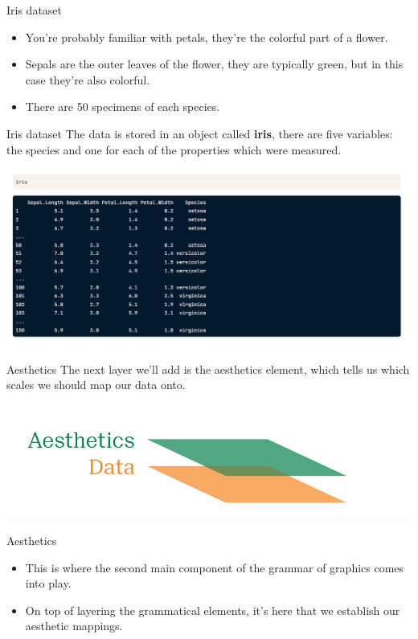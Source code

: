 \documentclass[
  ignorenonframetext,
]{beamer}
\begin{document}
\begin{frame}{Iris dataset}
\label{iris-dataset-2}
\begin{itemize}
\item
  You're probably familiar with petals, they're the colorful part of a
  flower.
\item
  Sepals are the outer leaves of the flower, they are typically green,
  but in this case they're also colorful.
\item
  There are 50 specimens of each species.
\end{itemize}
\end{frame}

\begin{frame}{Iris dataset}
\label{iris-dataset-3}
The data is stored in an object called \textbf{iris}, there are five
variables: the species and one for each of the properties which were
measured.

\includegraphics{../images/im128.png}
\end{frame}

\begin{frame}{Aesthetics}
\label{aesthetics}
The next layer we'll add is the aesthetics element, which tells us which
scales we should map our data onto.

\includegraphics{../images/im129.png}
\end{frame}

\begin{frame}{Aesthetics}
\label{aesthetics-1}
\begin{itemize}
\item
  This is where the second main component of the grammar of graphics
  comes into play.
\item
  On top of layering the grammatical elements, it's here that we
  establish our aesthetic mappings.
\end{itemize}
\end{frame}
\end{document}
